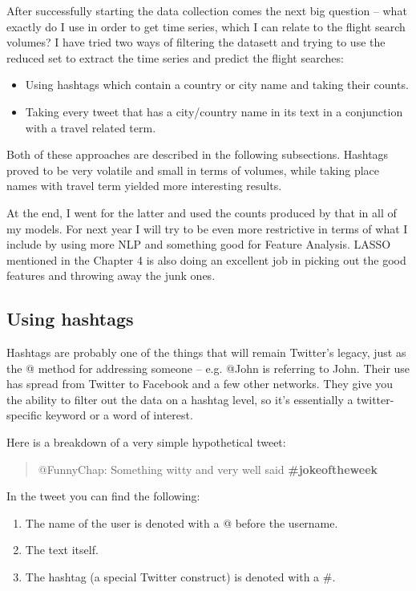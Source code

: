 \documentclass[minf,twoside,singlespacing,parskip,frontabs,notimes,11pt]{infthesis}
\begin{document}
After successfully starting the data collection comes the next big question -- what exactly do I use in order to get time series, which I can relate to the flight search volumes? I have tried two ways of filtering the datasett and trying to use the reduced set to extract the time series and predict the flight searches:
\begin{itemize}
\item Using hashtags which contain a country or city name and taking their counts.
\item Taking every tweet that has a city/country name in its text in a conjunction with a travel related term.
\end{itemize}

Both of these approaches are described in the following subsections. Hashtags proved to be very volatile and small in terms of volumes, while taking place names with travel term yielded more interesting results.  

At the end, I went for the latter and used the counts produced by that in all of my models. For next year I will try to be even more restrictive in terms of what I include by using more NLP and something good for Feature Analysis. LASSO \cite{lasso} mentioned in the Chapter 4 is also doing an excellent job in picking out the good features and throwing away the junk ones. 

\subsection{Using hashtags}
\label{sec:hashtag}

Hashtags are probably one of the things that will remain Twitter's legacy, just as the @ method for addressing someone -- e.g. @John is referring to John. Their use has spread from Twitter to Facebook and a few other networks. They give you the ability to filter out the data on a  hashtag level, so it's essentially a twitter-specific keyword or a word of interest. 


Here is a breakdown of a very simple hypothetical tweet:

\begin{quotation}
@FunnyChap: Something witty and very well said \bf{\#jokeoftheweek}
\end{quotation}

In the tweet you can find the following: 
\begin{enumerate}
\item The name of the user is denoted with a @ before the username.
\item The text itself.
\item The hashtag (a special Twitter construct) is denoted with a \#.
\end{enumerate}
\end{document}
